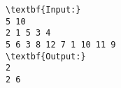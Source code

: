 \begin{verbatim}
\textbf{Input:}
5 10
2 1 5 3 4
5 6 3 8 12 7 1 10 11 9
\textbf{Output:}
2
2 6\end{verbatim}